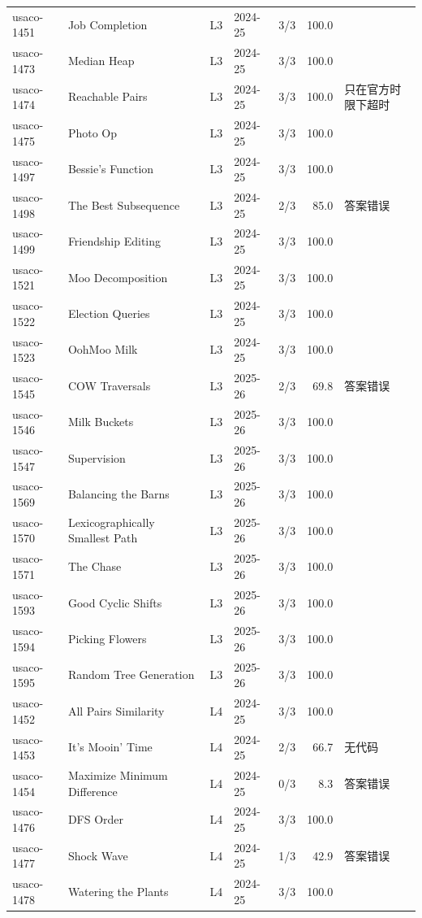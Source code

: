 \documentclass[11pt,a4paper,fontset=none]{ctexart}
\begin{document}
{\begin{longtable}{@{}l>{\raggedright\arraybackslash}p{3.4cm}llrr>{\raggedright\arraybackslash}p{3.1cm}@{}}
usaco-1451 & Job Completion & L3 & 2024-25 & 3/3 & 100.0 &  \\
usaco-1473 & Median Heap & L3 & 2024-25 & 3/3 & 100.0 &  \\
usaco-1474 & Reachable Pairs & L3 & 2024-25 & 3/3 & 100.0 & 只在官方时限下超时 \\
usaco-1475 & Photo Op & L3 & 2024-25 & 3/3 & 100.0 &  \\
usaco-1497 & Bessie's Function & L3 & 2024-25 & 3/3 & 100.0 &  \\
usaco-1498 & The Best Subsequence & L3 & 2024-25 & 2/3 & 85.0 & 答案错误 \\
usaco-1499 & Friendship Editing & L3 & 2024-25 & 3/3 & 100.0 &  \\
usaco-1521 & Moo Decomposition & L3 & 2024-25 & 3/3 & 100.0 &  \\
usaco-1522 & Election Queries & L3 & 2024-25 & 3/3 & 100.0 &  \\
usaco-1523 & OohMoo Milk & L3 & 2024-25 & 3/3 & 100.0 &  \\
usaco-1545 & COW Traversals & L3 & 2025-26 & 2/3 & 69.8 & 答案错误 \\
usaco-1546 & Milk Buckets & L3 & 2025-26 & 3/3 & 100.0 &  \\
usaco-1547 & Supervision & L3 & 2025-26 & 3/3 & 100.0 &  \\
usaco-1569 & Balancing the Barns & L3 & 2025-26 & 3/3 & 100.0 &  \\
usaco-1570 & Lexicographically Smallest Path & L3 & 2025-26 & 3/3 & 100.0 &  \\
usaco-1571 & The Chase & L3 & 2025-26 & 3/3 & 100.0 &  \\
usaco-1593 & Good Cyclic Shifts & L3 & 2025-26 & 3/3 & 100.0 &  \\
usaco-1594 & Picking Flowers & L3 & 2025-26 & 3/3 & 100.0 &  \\
usaco-1595 & Random Tree Generation & L3 & 2025-26 & 3/3 & 100.0 &  \\
usaco-1452 & All Pairs Similarity & L4 & 2024-25 & 3/3 & 100.0 &  \\
usaco-1453 & It's Mooin' Time & L4 & 2024-25 & 2/3 & 66.7 & 无代码 \\
usaco-1454 & Maximize Minimum Difference & L4 & 2024-25 & 0/3 & 8.3 & 答案错误 \\
usaco-1476 & DFS Order & L4 & 2024-25 & 3/3 & 100.0 &  \\
usaco-1477 & Shock Wave & L4 & 2024-25 & 1/3 & 42.9 & 答案错误 \\
usaco-1478 & Watering the Plants & L4 & 2024-25 & 3/3 & 100.0 &  \\

\end{longtable}}
\end{document}
